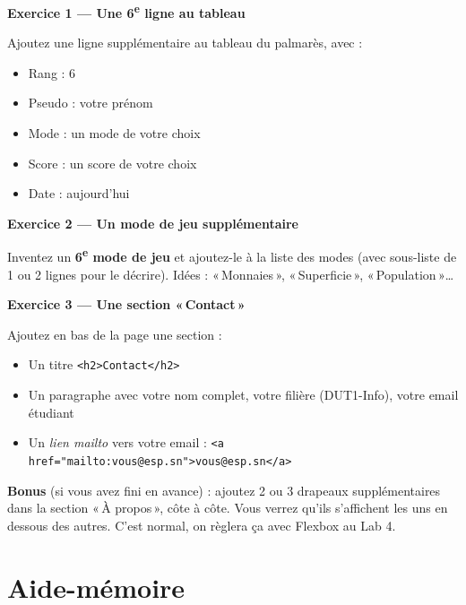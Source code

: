 \documentclass[11pt,a4paper]{article}
\begin{document}
\begin{objectifbox}
\textbf{Exercice 1 --- Une 6\textsuperscript{e} ligne au tableau}

Ajoutez une ligne supplémentaire au tableau du palmarès, avec :
\begin{itemize}[nosep]
    \item Rang : 6
    \item Pseudo : votre prénom
    \item Mode : un mode de votre choix
    \item Score : un score de votre choix
    \item Date : aujourd'hui
\end{itemize}

\medskip

\textbf{Exercice 2 --- Un mode de jeu supplémentaire}

Inventez un \textbf{6\textsuperscript{e} mode de jeu} et ajoutez-le à la
liste des modes (avec sous-liste de 1 ou 2 lignes pour le décrire). Idées :
«\,Monnaies\,», «\,Superficie\,», «\,Population\,»\ldots

\medskip

\textbf{Exercice 3 --- Une section «\,Contact\,»}

Ajoutez en bas de la page une section :
\begin{itemize}[nosep]
    \item Un titre \texttt{<h2>Contact</h2>}
    \item Un paragraphe avec votre nom complet, votre filière (DUT1-Info), votre email étudiant
    \item Un \emph{lien mailto} vers votre email : \texttt{<a href="mailto:vous@esp.sn">vous@esp.sn</a>}
\end{itemize}

\medskip

\textbf{Bonus} (si vous avez fini en avance) : ajoutez 2 ou 3 drapeaux
supplémentaires dans la section «\,À propos\,», côte à côte. Vous verrez
qu'ils s'affichent les uns en dessous des autres. C'est normal, on
règlera ça avec Flexbox au Lab 4.
\end{objectifbox}

\newpage

\section{Aide-mémoire}
\end{document}
